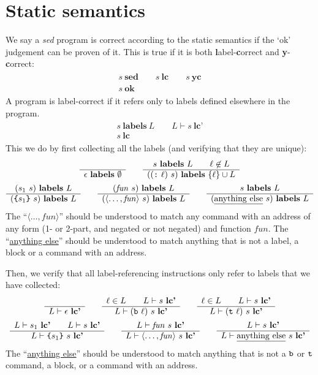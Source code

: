 \documentclass[11pt]{article}
\newcommand\SED{\emph{sed}}
\newcommand\RULE[3][]{\begin{array}{c} #2 \\ \hline #3 \end{array}}
\newcommand\J[1]{\ensuremath{\textbf{#1}}}
\newcommand\cmd[1]{\ensuremath{\text{\texttt{#1}}}}
\renewcommand\arg[1]{\ensuremath{\mathit{#1}}}
\newcommand\angles[1]{\langle #1 \rangle}
\begin{document}
\section{Static semantics}

We say a \SED{} program is correct according to the static semantics if the `ok' judgement can be proven of it.
This is true if it is both \textbf{l}abel-\textbf{c}orrect and \textbf{y}-\textbf{c}orrect:
\begin{gather*}
	\RULE{s\ \J{sed} \qquad s\ \J{lc} \qquad s\ \J{yc}}{s\ \J{ok}}
\end{gather*}
%
A program is label-correct if it refers only to labels defined elsewhere in the program.
\begin{gather*}
	\RULE{s\ \J{labels}\ L \qquad L \vdash s\ \J{lc'}}{s\ \J{lc}}
\end{gather*}
%
This we do by first collecting all the labels (and verifying that they are unique):
\begin{gather*}
	\RULE{}{\epsilon\ \J{labels}\ \emptyset} \qquad
	\RULE{s\ \J{labels}\ L \qquad \ell \not\in L}{((\cmd{:}\ \ell)\ s)\ \J{labels}\ \{\ell\} \cup L} \\
%
	\RULE{(s_1\ s)\ \J{labels}\ L}{(\cmd{\{} s_1 \cmd{\}}\ s)\ \J{labels}\ L} \qquad
	\RULE{(\arg{fun}\ s)\ \J{labels}\ L}{(\angles{\ldots, \arg{fun}}\ s)\ \J{labels}\ L} \qquad
	\RULE{s\ \J{labels}\ L}{(\text{\underline{anything else}}\ s)\ \J{labels}\ L}
\end{gather*}
The ``$\angles{\ldots, \arg{fun}}$'' should be understood to match any command with an address of any form (1- or 2-part, and negated or not negated) and function \arg{fun}.
The ``\underline{anything else}'' should be understood to match anything that is not a label, a block or a command with an address.

Then, we verify that all label-referencing instructions only refer to labels that we have collected:
\begin{gather*}
	\RULE{}{L \vdash \epsilon\ \J{lc'}} \qquad
	\RULE{\ell \in L \qquad L \vdash s\ \J{lc'}}{L \vdash (\cmd{b}\ \ell)\ s\ \J{lc'}} \qquad
	\RULE{\ell \in L \qquad L \vdash s\ \J{lc'}}{L \vdash (\cmd{t}\ \ell)\ s\ \J{lc'}} \\
%
	\RULE{L \vdash s_1\ \J{lc'} \qquad L \vdash s\ \J{lc'}}{L \vdash \cmd{\{} s_1 \cmd{\}}\ s\ \J{lc'}} \qquad
	\RULE{L \vdash \arg{fun}\ s\ \J{lc'}}{L \vdash \angles{\ldots, \arg{fun}}\ s\ \J{lc'}} \qquad
	\RULE{L \vdash s\ \J{lc'}}{L \vdash \text{\underline{anything else}}\ s\ \J{lc'}}
\end{gather*}
The ``\underline{anything else}'' should be understood to match anything that is not a \cmd{b} or \cmd{t} command, a block, or a command with an address.
\end{document}
